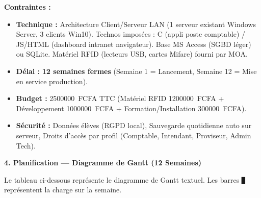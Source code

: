\documentclass[11pt]{article}
\begin{document}
\begin{exoresolu}
\textbf{Contraintes :}
\begin{itemize}
    \item \textbf{Technique :} Architecture Client/Serveur LAN (1 serveur existant Windows Server, 3 clients Win10). Technos imposées : C (appli poste comptable) / JS/HTML (dashboard intranet navigateur). Base MS Access (SGBD léger) ou SQLite. Matériel RFID (lecteurs USB, cartes Mifare) fourni par MOA.
    \item \textbf{Délai :} \textbf{12 semaines fermes} (Semaine 1 = Lancement, Semaine 12 = Mise en service production).
    \item \textbf{Budget :} \SI{2500000}{FCFA} TTC (Matériel RFID \SI{1200000}{FCFA} + Développement \SI{1000000}{FCFA} + Formation/Installation \SI{300000}{FCFA}).
    \item \textbf{Sécurité :} Données élèves (RGPD local), Sauvegarde quotidienne auto sur serveur, Droits d'accès par profil (Comptable, Intendant, Proviseur, Admin Tech).
\end{itemize}

\medskip
\textbf{4. Planification — Diagramme de Gantt (12 Semaines)}

Le tableau ci-dessous représente le diagramme de Gantt textuel. Les barres \texttt{█} représentent la charge sur la semaine.


\end{exoresolu}
\end{document}
